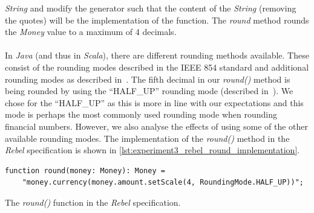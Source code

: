 \textit{String} and modify the generator such that the content of the
\textit{String} (removing the quotes) will be the implementation of the
function. The \textit{round} method rounds the \textit{Money} value to a maximum
of 4 decimals.\\
\\
In \textit{Java} (and thus in \textit{Scala}), there are different rounding
methods available. These consist of the rounding modes described in the IEEE 854
standard and additional rounding modes as described
in~\cite{cowlishaw2003decimal}. The fifth decimal in our \textit{round()} method
is being rounded by using the ``HALF\_UP'' rounding mode
(described in~\cite{cowlishaw2003decimal}). We chose for the ``HALF\_UP'' as this is more in line with
our expectations and this mode is perhaps the most commonly used rounding mode when rounding
financial numbers. However, we also analyse the effects of using some of the other available rounding modes. The implementation of the \textit{round()} method in the
\textit{Rebel} specification is shown in
\autoref{lst:experiment3_rebel_round_implementation}.
\begin{sourcecode}[!ht]
\begin{lstlisting}[language=Rebel]
function round(money: Money): Money =
    "money.currency(money.amount.setScale(4, RoundingMode.HALF_UP))";
\end{lstlisting}
\caption{The \textit{round()} function in the \textit{Rebel} specification.}
\label{lst:experiment3_rebel_round_implementation}
\end{sourcecode}
\FloatBarrier\noindent

